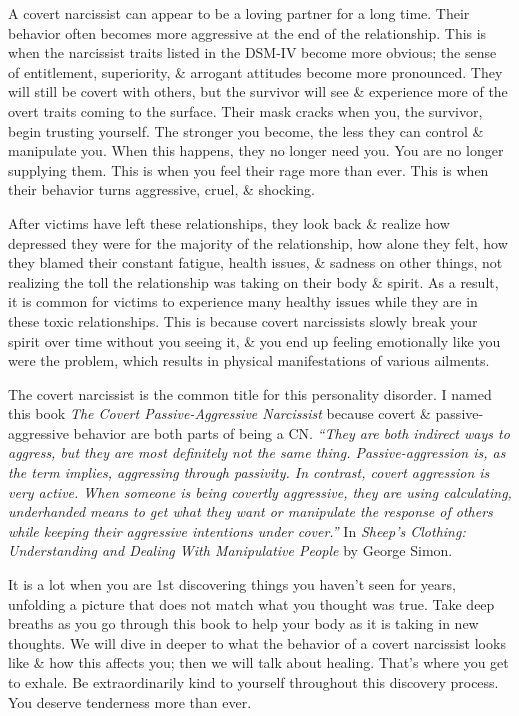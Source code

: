 \documentclass{article}
\numberwithin{equation}{section}
\begin{document}
A covert narcissist can appear to be a loving partner for a long time. Their behavior often becomes more aggressive at the end of the relationship. This is when the narcissist traits listed in the DSM-IV become more obvious; the sense of entitlement, superiority, \& arrogant attitudes become more pronounced. They will still be covert with others, but the survivor will see \& experience more of the overt traits coming to the surface. Their mask cracks when you, the survivor, begin trusting yourself. The stronger you become, the less they can control \& manipulate you. When this happens, they no longer need you. You are no longer supplying them. This is when you feel their rage more than ever. This is when their behavior turns aggressive, cruel, \& shocking.

After victims have left these relationships, they look back \& realize how depressed they were for the majority of the relationship, how alone they felt, how they blamed their constant fatigue, health issues, \& sadness on other things, not realizing the toll the relationship was taking on their body \& spirit. As a result, it is common for victims to experience many healthy issues while they are in these toxic relationships. This is because covert narcissists slowly break your spirit over time without you seeing it, \& you end up feeling emotionally like you were the problem, which results in physical manifestations of various ailments.

The covert narcissist is the common title for this personality disorder. I named this book \textit{The Covert Passive-Aggressive Narcissist} because covert \& passive-aggressive behavior are both parts of being a CN. \textit{``They are both indirect ways to aggress, but they are most definitely not the same thing. Passive-aggression is, as the term implies, aggressing through passivity. In contrast, covert aggression is very active. When someone is being covertly aggressive, they are using calculating, underhanded means to get what they want or manipulate the response of others while keeping their aggressive intentions under cover.''} In \textit{Sheep's Clothing: Understanding and Dealing With Manipulative People} by George Simon.

It is a lot when you are 1st discovering things you haven't seen for years, unfolding a picture that does not match what you thought was true. Take deep breaths as you go through this book to help your body as it is taking in new thoughts. We will dive in deeper to what the behavior of a covert narcissist looks like \& how this affects you; then we will talk about healing. That's where you get to exhale. Be extraordinarily kind to yourself throughout this discovery process. You deserve tenderness more than ever.
\end{document}
